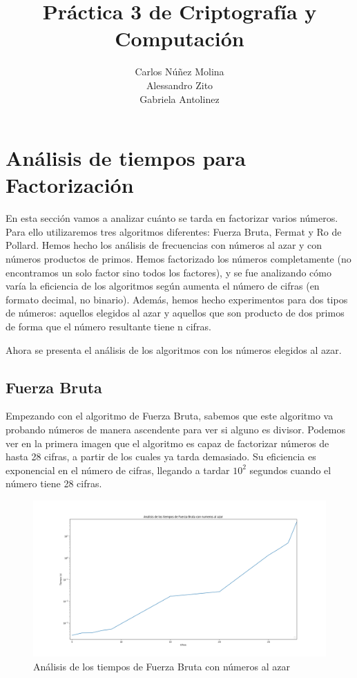 \documentclass{article}
\title{Práctica 3 de Criptografía y Computación}
\date{}
\author{Carlos Núñez Molina \\ Alessandro Zito \\ Gabriela Antolinez}
\begin{document}
	\maketitle
	\newpage

    \section{Análisis de tiempos para Factorización}

    En esta sección vamos a analizar cuánto se tarda en factorizar varios números. Para ello utilizaremos tres algoritmos diferentes: Fuerza Bruta, Fermat y Ro de Pollard. Hemos hecho los análisis de frecuencias con números al azar y con números productos de primos. Hemos factorizado los números completamente (no encontramos un solo factor sino todos los factores), y se fue analizando cómo varía la eficiencia de los algoritmos según aumenta el número de cifras (en formato decimal, no binario). Además, hemos hecho experimentos para dos tipos de números: aquellos elegidos al azar y aquellos que son producto de dos primos de forma que el número resultante tiene n cifras.
    
Ahora se presenta el análisis de los algoritmos con los números elegidos al azar.

    \subsection{Fuerza Bruta}
    Empezando con el algoritmo de Fuerza Bruta, sabemos que este algoritmo va probando números de manera ascendente para ver si alguno es divisor. Podemos ver en la primera imagen que el algoritmo es capaz de factorizar números de hasta 28 cifras, a partir de los cuales ya tarda demasiado. Su eficiencia es exponencial en el número de cifras, llegando a tardar \begin{math} 10^{2} \end{math} segundos cuando el número tiene 28 cifras.



    \begin{figure}[ht!]
        \centering
        \includegraphics[width=\linewidth]{Figure_1}
        \caption{Análisis de los tiempos de Fuerza Bruta con números al azar}
        \label{fig:Figure_1}
    \end{figure}
\end{document}
